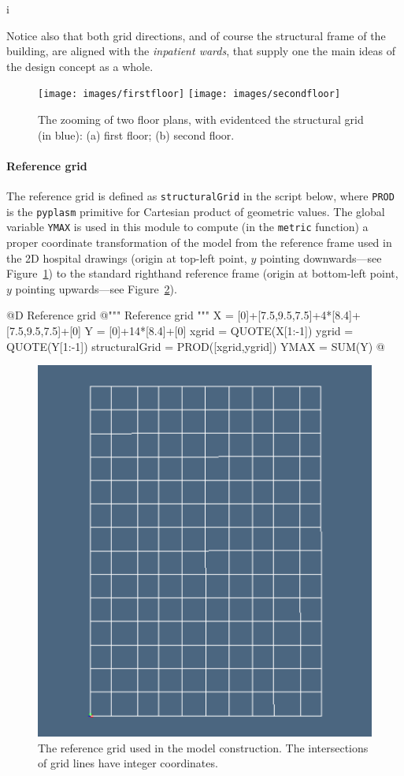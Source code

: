 i\documentclass[11pt,oneside]{article}    %
\begin{document}
Notice also that both grid directions, and of course the structural frame of the building, are aligned with the \emph{inpatient wards}, that supply one the main ideas of the design concept as a whole.


\begin{figure}[htbp] %
   \centering
   \texttt{[image: images/firstfloor]} 
   \texttt{[image: images/secondfloor]} 
   \caption{The zooming of two floor plans, with evidentced the structural grid (in blue): (a) first floor; (b) second floor.}
   \label{fig:referencegrid1}
\end{figure}

\paragraph{Reference grid}

The reference grid is defined as \texttt{structuralGrid} in the script below, where \texttt{PROD} is the \texttt{pyplasm} primitive for Cartesian product of geometric values. The global variable \texttt{YMAX} is used in this module to compute (in the \texttt{metric} function) a proper coordinate transformation of the model from the reference frame used in the 2D hospital drawings (origin at top-left point, $y$ pointing downwards---see Figure~\ref{fig:referencegrid1}) to the standard righthand reference frame (origin at bottom-left point, $y$ pointing upwards---see Figure~\ref{fig:referencegrid2}).

@D Reference grid
@{""" Reference grid """
X = [0]+[7.5,9.5,7.5]+4*[8.4]+[7.5,9.5,7.5]+[0]
Y = [0]+14*[8.4]+[0]
xgrid = QUOTE(X[1:-1])
ygrid = QUOTE(Y[1:-1])
structuralGrid = PROD([xgrid,ygrid])
YMAX = SUM(Y)
@}


\begin{figure}[htbp] %
   \centering
   \includegraphics[width=0.33\linewidth]{images/hospitalgrid} 
   \caption{The reference grid used in the model construction. The intersections of grid lines have integer coordinates.}
   \label{fig:referencegrid2}
\end{figure}
\end{document}
